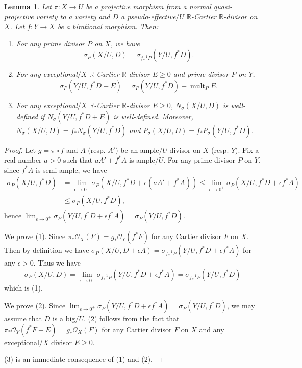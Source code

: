 \documentclass[11pt]{amsart}
\numberwithin{equation}{section}
\newcommand{\Rr}{\mathbb{R}}
\newcommand{\mult}{\operatorname{mult}}
\newcommand{\Oo}{\mathcal{O}}
\newtheorem{lem}[thm]{Lemma}
\theoremstyle{definition}
\theoremstyle{definition}
\theoremstyle{definition}
\begin{document}
\begin{lem}\label{lem: nz keep under pullback}
Let $\pi: X\rightarrow U$ be a projective morphism from a normal quasi-projective variety to a variety and $D$ a pseudo-effective$/U$ $\Rr$-Cartier $\Rr$-divisor on $X$. Let $f: Y\rightarrow X$ be a birational morphism. Then:
\begin{enumerate}
    \item For any prime divisor $P$ on $X$, we have
$$\sigma_P(X/U,D)=\sigma_{f^{-1}_*P}(Y/U,f^*D).$$
    \item For any exceptional$/X$ $\Rr$-Cartier $\Rr$-divisor $E\ge0$ and prime divisor $P$ on $Y$, $$\sigma_P(Y/U,f^*D+E)=\sigma_P(Y/U,f^*D)+\mult_PE.$$
\item For any exceptional$/X$ $\Rr$-Cartier $\Rr$-divisor $E\ge0$, $N_{\sigma}(X/U,D)$ is well-defined if $N_{\sigma}(Y/U,f^*D+E)$ is well-defined. Moreover, $N_{\sigma}(X/U,D)=f_*N_{\sigma}(Y/U,f^*D)$ and $P_{\sigma}(X/U,D)=f_*P_{\sigma}(Y/U,f^*D)$.
\end{enumerate}
\end{lem}
\begin{proof}
Let $g=\pi\circ f$ and $A$ (resp. $A'$) be an ample$/U$ divisor on $X$ (resp. $Y$). Fix a real number $a>0$ such that $aA'+f^*A$ is ample$/U$. For any prime divisor $P$ on $Y$, since $f^*A$ is semi-ample, we have
\begin{align*}
    \sigma_P(X/U,f^*D)&=\lim_{\epsilon\rightarrow 0^+}\sigma_P(X/U,f^*D+\epsilon(aA'+f^*A))\leq \lim_{\epsilon\rightarrow 0^+}\sigma_P(X/U,f^*D+\epsilon f^*A)\\
    &\leq\sigma_P(X/U,f^*D),
\end{align*}
hence $\lim_{\epsilon\to0^+}\sigma_P(Y/U,f^*D+\epsilon f^*A)=\sigma_P(Y/U,f^*D)$.


We prove (1). Since $\pi_*\Oo_X(F)=g_*\Oo_Y(f^*F)$ for any Cartier divisor $F$ on $X$. Then by definition we have $\sigma_P(X/U,D+\epsilon A)=\sigma_{f_*^{-1}P}(Y/U,f^*D+\epsilon f^*A)$ for any $\epsilon>0$. Thus we have 
$$
\sigma_P(X/U,D)=\lim_{\epsilon\to0^+}\sigma_{f_*^{-1}P}(Y/U,f^*D+\epsilon f^*A)=\sigma_{f^{-1}_*P}(Y/U,f^*D)
$$ 
which is (1).

We prove (2). Since $\lim_{\epsilon\to0^+}\sigma_P(Y/U,f^*D+\epsilon f^*A)=\sigma_P(Y/U,f^*D)$, we may assume that $D$ is a big$/U$. (2) follows from the fact that $\pi_*\Oo_Y(f^*F+E)=g_*\Oo_X(F)$ for any Cartier divisor $F$ on $X$ and any exceptional$/X$ divisor $E\ge0$.


(3) is an immediate consequence of (1) and (2).
\end{proof}
\end{document}
